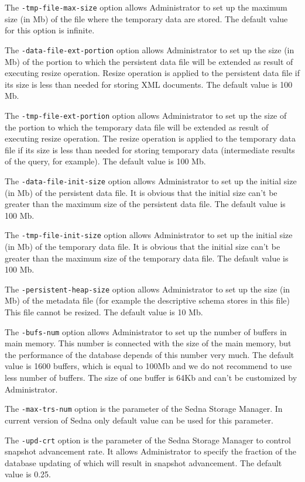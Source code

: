 \documentclass[a4paper,12pt]{article}
\begin{document}
The \verb!-tmp-file-max-size! option allows Administrator to set up the maximum size (in Mb) of the file where the temporary data are stored. The default value for this option is infinite.

The \verb!-data-file-ext-portion! option allows Administrator to set up the size (in Mb) of the portion to which the persistent data file will be extended as result of executing resize operation. Resize operation is applied to the persistent data file if its size is less than needed for storing XML documents. The default value is 100 Mb.

The \verb!-tmp-file-ext-portion! option allows Administrator to set up the size of the portion to which the temporary data file will be extended as result of executing resize operation. The resize operation is applied to the temporary data file if its size is less than needed for storing temporary data (intermediate results of the query, for example). The default value is 100 Mb.

The \verb!-data-file-init-size! option allows Administrator to set up the initial size (in Mb) of the persistent data file. It is obvious that the initial size can't be greater than the maximum size of the persistent data file. The default value is 100 Mb.

The \verb!-tmp-file-init-size! option allows Administrator to set up the initial size (in Mb) of the temporary data file. It is obvious that the initial size can't be greater than the maximum size of the temporary data file. The default value is 100 Mb.

The \verb!-persistent-heap-size! option allows Administrator to set up the size (in Mb) of the metadata file (for example the descriptive schema stores in this file) This file cannot be resized. The default value is 10 Mb.

The \verb!-bufs-num! option allows Administrator to set up the number of buffers in main memory. This number is connected with the size of the main memory, but the performance of the database depends of this number very much. The default value is 1600 buffers, which is equal to 100Mb and we do not recommend to use less number of buffers. The size of one buffer is 64Kb and can't be customized by Administrator.

The \verb!-max-trs-num! option is the parameter of the Sedna Storage Manager. In current version of Sedna only default value can be used for this parameter.

The \verb!-upd-crt! option is the parameter of the Sedna Storage Manager to control snapshot advancement rate. It allows Administrator to specify the fraction of the database updating of which will result in snapshot advancement. The default value is 0.25.
\end{document}
